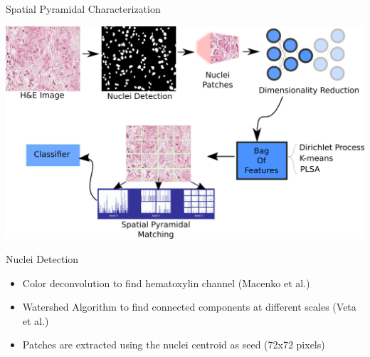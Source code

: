 \documentclass[usenames,dvipsnames]{beamer}
\begin{document}
%
%    

%
%    


\begin{frame}{Spatial Pyramidal Characterization }

\includegraphics[width=\textwidth]{imagenes_cnn/metodonuevo.png}
    
\end{frame}



\begin{frame}{Nuclei Detection}

\begin{itemize}
    \item Color deconvolution to find hematoxylin channel (Macenko et al.)
    \item Watershed Algorithm to find connected components at different scales (Veta et al.)
    \item Patches are extracted using the nuclei centroid as seed (72x72 pixels)
\end{itemize}
    
\end{frame}
\end{document}
